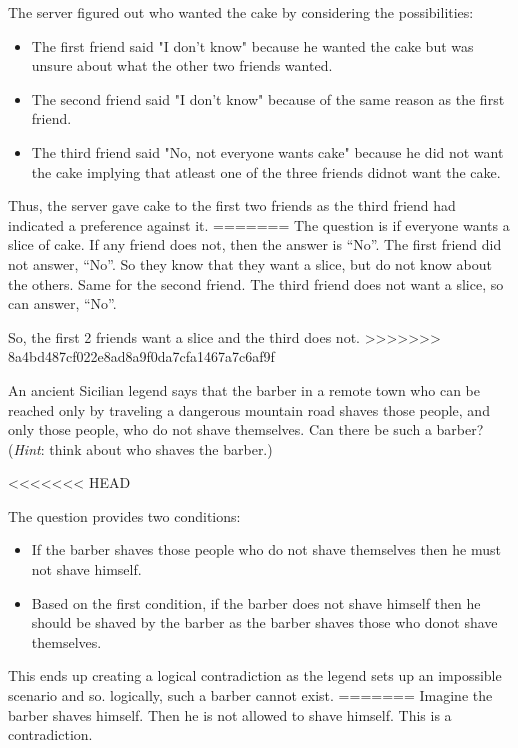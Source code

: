 \documentclass[a4paper]{exam}
\begin{document}
\begin{questions}
\begin{solution}
    The server figured out who wanted the cake by considering the possibilities:
    \begin{itemize}
      \item The first friend said "I don't know" because he wanted the cake but was unsure about what the other two friends wanted.
      \item The second friend said "I don't know" because of the same reason as the first friend.
      \item The third friend said "No, not everyone wants cake" because he did not want the cake implying that atleast one of the three friends didnot want the cake.
    \end{itemize}
    Thus, the server gave cake to the first two friends as the third friend had indicated a preference against it.
=======
    The question is if everyone wants a slice of cake. If any friend does not, then the answer is ``No''. The first friend did not answer, ``No''. So they know that they want a slice, but do not know about the others. Same for the second friend. The third friend does not want a slice, so can answer, ``No''.

    So, the first 2 friends want a slice and the third does not.
>>>>>>> 8a4bd487cf022e8ad8a9f0da7cfa1467a7c6af9f
  \end{solution}
  
  \question An ancient Sicilian legend says that the barber in a remote town who can be reached only by traveling a dangerous mountain road shaves those people, and only those people, who do not shave themselves. Can there be such a barber? (\textit{Hint}: think about who shaves the barber.)
  \begin{solution}
<<<<<<< HEAD
    
    The question provides two conditions:
    \begin{itemize}
      \item If the barber shaves those people who do not shave themselves then he must not shave himself.
      \item Based on the first condition, if the barber does not shave himself then he should be shaved by the barber as the barber shaves those who donot shave themselves.
    \end{itemize}
    This ends up creating a logical contradiction as the legend sets up an impossible scenario and so. logically, such a barber cannot exist. 
=======
    Imagine the barber shaves himself. Then he is not allowed to shave himself. This is a contradiction.


\end{solution}
\end{questions}
\end{document}
